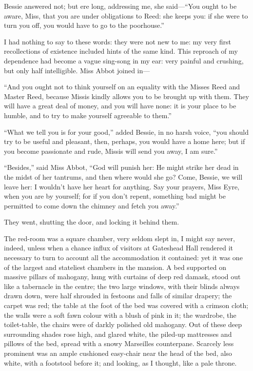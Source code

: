 Bessie answered not; but ere long, addressing me, she
said---\enquote{You ought to be aware, Miss, that you are under
obligations to \Mrs{} Reed: she keeps you: if she were to turn you off,
you would have to go to the poorhouse.}

I had nothing to say to these words: they were not new to me: my very
first recollections of existence included hints of the same kind.  This
reproach of my dependence had become a vague sing-song in my ear: very
painful and crushing, but only half intelligible.  Miss Abbot joined
in---

\enquote{And you ought not to think yourself on an equality with the
Misses Reed and Master Reed, because Missis kindly allows you to be
brought up with them.  They will have a great deal of money, and you
will have none: it is your place to be humble, and to try to make
yourself agreeable to them.}

\enquote{What we tell you is for your good,} added Bessie, in no harsh
voice, \enquote{you should try to be useful and pleasant, then, perhaps,
you would have a home here; but if you become passionate and rude,
Missis will send you away, I am sure.}

\enquote{Besides,} said Miss Abbot, \enquote{God will punish her: He
might strike her dead in the midst of her tantrums, and then where would
she go?  Come, Bessie, we will leave her: I wouldn't have her heart for
anything.  Say your prayers, Miss Eyre, when you are by yourself; for if
you don't repent, something bad might be permitted to come down the
chimney and fetch you away.}

They went, shutting the door, and locking it behind them.

The red-room was a square chamber, very seldom slept in, I might say
never, indeed, unless when a chance influx of visitors at Gateshead Hall
rendered it necessary to turn to account all the accommodation it
contained: yet it was one of the largest and stateliest chambers in the
mansion.  A bed supported on massive pillars of mahogany, hung with
curtains of deep red damask, stood out like a tabernacle in the centre;
the two large windows, with their blinds always drawn down, were half
shrouded in festoons and falls of similar drapery; the carpet was red;
the table at the foot of the bed was covered with a crimson cloth; the
walls were a soft fawn colour with a blush of pink in it; the wardrobe,
the toilet-table, the chairs were of darkly polished old mahogany.  Out
of these deep surrounding shades rose high, and glared white, the
piled-up mattresses and pillows of the bed, spread with a snowy
Marseilles counterpane.  Scarcely less prominent was an ample cushioned
easy-chair near the head of the bed, also white, with a footstool before
it; and looking, as I thought, like a pale throne.

